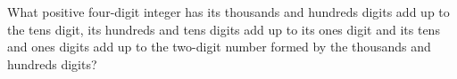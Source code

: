 What positive four-digit integer has its thousands and hundreds digits add up to the tens digit, its hundreds and tens digits add up to its ones digit and its tens and ones digits add up to the two-digit number formed by the thousands and hundreds digits?

